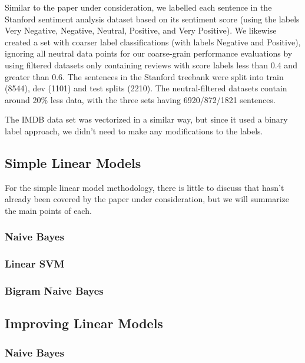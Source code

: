 \documentclass[conference]{IEEEtran}
\begin{document}
Similar to the paper under consideration, we labelled each sentence in the Stanford sentiment analysis dataset based on its sentiment score (using the labels Very Negative, Negative, Neutral, Positive, and Very Positive). We likewise created a set with coarser label classifications (with labels Negative and Positive), ignoring all neutral data points for our coarse-grain performance evaluations by using filtered datasets only containing reviews with score labels less than 0.4 and  greater than 0.6. The sentences in the Stanford treebank were split into train (8544), dev (1101) and test splits (2210). The neutral-filtered datasets contain around 20\% less data, with the three sets having 6920/872/1821 sentences.


The IMDB data set was vectorized in a similar way, but since it used a binary label approach, we didn't need to make any modifications to the labels.

\subsection{Simple Linear Models}

For the simple linear model methodology, there is little to discuss that hasn't already been covered by the paper under consideration, but we will summarize the main points of each. 

\subsubsection{Naive Bayes}


\subsubsection{Linear SVM}


\subsubsection{Bigram Naive Bayes}


\subsection{Improving Linear Models}


\subsubsection{Naive Bayes}
\end{document}
